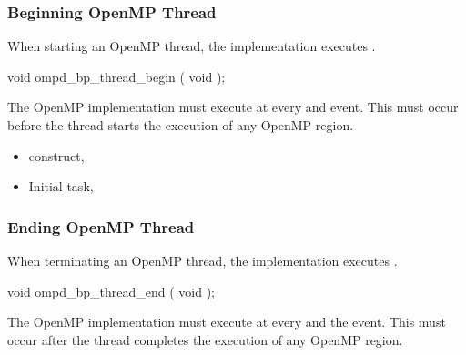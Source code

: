 \subsubsection{Beginning OpenMP Thread}
\label{subsubsec:ompd_bp_thread_begin}

\summary

When starting an OpenMP thread, the implementation executes
.

\format
\begin{cspecific}
\begin{ompSyntax}
void ompd_bp_thread_begin ( void );
\end{ompSyntax}
\end{cspecific}


\descr

The OpenMP implementation must execute 
 at every  and  event.
This must occur before the thread starts the execution of any
OpenMP region.

\crossreferences
\begin{itemize}
\item
   construct, 
\item
  Initial task, 
\end{itemize}



\subsubsection{Ending OpenMP Thread}
\label{subsubsec:ompd_bp_thread_end}

\summary

When terminating an OpenMP thread, the implementation 
executes .

\format
\begin{cspecific}
\begin{ompSyntax}
void ompd_bp_thread_end ( void );
\end{ompSyntax}
\end{cspecific}


\descr

The OpenMP implementation must execute 
 at every  and the  event.
This must occur after the thread completes the execution of any OpenMP region.

